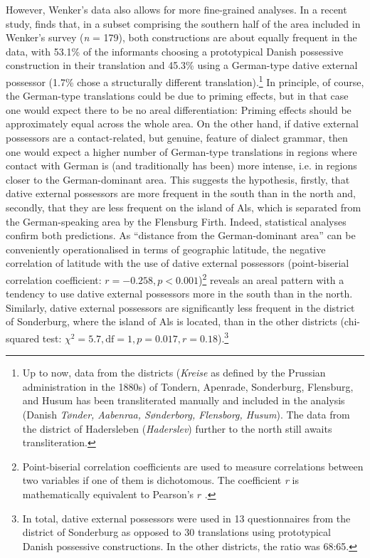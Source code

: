 \documentclass[output=paper]{langsci/langscibook}
\begin{document}
However, Wenker’s data also allows for more fine-grained analyses. In a recent study, \citet{Hoeder.forth} finds that, in a subset comprising the southern half of the area included in Wenker’s survey (\textit{n} = 179), both constructions are about equally frequent in the data, with 53.1\% of the informants choosing a prototypical Danish possessive construction in their translation and 45.3\% using a German-type dative external possessor (1.7\% chose a structurally different translation).\footnote{Up to now, data from the districts (\textit{Kreise} as defined by the Prussian administration in the 1880s) of Tondern, Apenrade, Sonderburg, Flensburg, and Husum has been transliterated manually and included in the analysis (Danish \textit{Tønder, Aabenraa, Sønderborg, Flensborg, Husum}). The data from the district of Hadersleben (\textit{Haderslev}) further to the north still awaits transliteration.} In principle, of course, the German-type translations could be due to priming effects, but in that case one would expect there to be no areal differentiation: Priming effects should be approximately equal across the whole area. On the other hand, if dative external possessors are a contact-related, but genuine, feature of dialect grammar, then one would expect a higher number of German-type translations in regions where contact with German is (and traditionally has been) more intense, i.e. in regions closer to the German-dominant area. This suggests the hypothesis, firstly, that dative external possessors are more frequent in the south than in the north and, secondly, that they are less frequent on the island of Als, which is separated from the German-speaking area by the Flensburg Firth. Indeed, statistical analyses confirm both predictions. As “distance from the German-dominant area” can be conveniently operationalised in terms of geographic latitude, the negative correlation of latitude with the use of dative external possessors (point-biserial correlation coefficient: $r = -0.258, p < 0.001$)\footnote{Point-biserial correlation coefficients are used to measure correlations between two variables if one of them is dichotomous. The coefficient \textit{r} is mathematically equivalent to Pearson’s $r$ \citep{Kornbrot.2014}.} reveals an areal pattern with a tendency to use dative external possessors more in the south than in the north. Similarly, dative external possessors are significantly less frequent in the district of Sonderburg, where the island of Als is located, than in the other districts (chi-squared test: $\chi^2 = 5.7, \text{df} = 1, p = 0.017, r =0.18$).\footnote{In total, dative external possessors were used in 13 questionnaires from the district of Sonderburg as opposed to 30 translations using prototypical Danish possessive constructions. In the other districts, the ratio was 68:65.}
\end{document}
